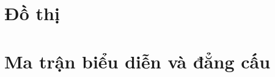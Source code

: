 \documentclass[14pt]{extarticle}
\begin{document}
\section{Đồ thị}


\section{Ma trận biểu diễn và đẳng cấu}


\end{document}
